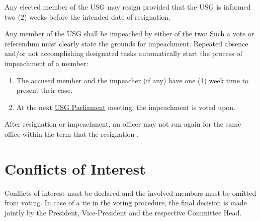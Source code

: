 {	\protect\begin{parenum}
		\item Any elected member of the USG may resign provided that the USG is informed two (2) weeks before the intended date of resignation.		
		\item Any member of the USG shall be impeached by either of the two: Such a vote or referendum must clearly state the grounds for impeachment. Repeated absence  and/or not accomplishing designated tasks automatically start the process of impeachment of a member:
		\begin{enumerate}
			\item The accused member and the impeacher (if any) have one (1) week time to present their case.
			\item At the next \hyperref[USGParliamentDef]{USG Parliament} meeting, the impeachment is voted upon.
		\end{enumerate}
		
		\item After resignation or impeachment, an officer may not run again for the same office within the term that the resignation .
	\end{parenum}

	\protect\section{Conflicts of Interest}
	Conflicts of interest must be declared and the involved members must be omitted from voting. In case of a tie in the voting procedure, the final decision is made jointly by the President, Vice-President and the respective Committee Head.
	
}
